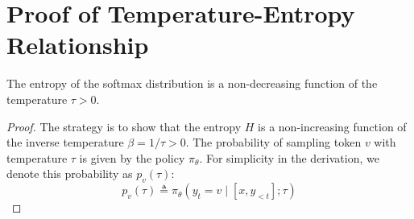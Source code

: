 \newpage
\section{Proof of Temperature-Entropy Relationship}
\label{app:entropy_proof}

\begin{proposition}
The entropy of the softmax distribution is a non-decreasing function of the temperature $\tau > 0$.
\end{proposition}

\begin{proof}
The strategy is to show that the entropy $H$ is a non-increasing function of the inverse temperature $\beta = 1/\tau > 0$.
The probability of sampling token $v$ with temperature $\tau$ is given by the policy $\pi_\theta$. For simplicity in the derivation, we denote this probability as $p_v(\tau)$:
\[
p_v(\tau) \triangleq \pi_\theta(y_t=v \mid [x, y_{<t}]; \tau)
\]


\end{proof}
